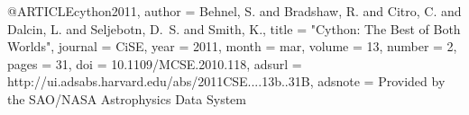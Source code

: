 
@ARTICLE{cython2011,
   author = {{Behnel}, S. and {Bradshaw}, R. and {Citro}, C. and {Dalcin}, L. and
	{Seljebotn}, D.~S. and {Smith}, K.},
    title = "{Cython: The Best of Both Worlds}",
  journal = {CiSE},
     year = 2011,
    month = mar,
   volume = 13,
   number = 2,
    pages = {31},
      doi = {10.1109/MCSE.2010.118},
   adsurl = {http://ui.adsabs.harvard.edu/abs/2011CSE....13b..31B},
  adsnote = {Provided by the SAO/NASA Astrophysics Data System}
}
